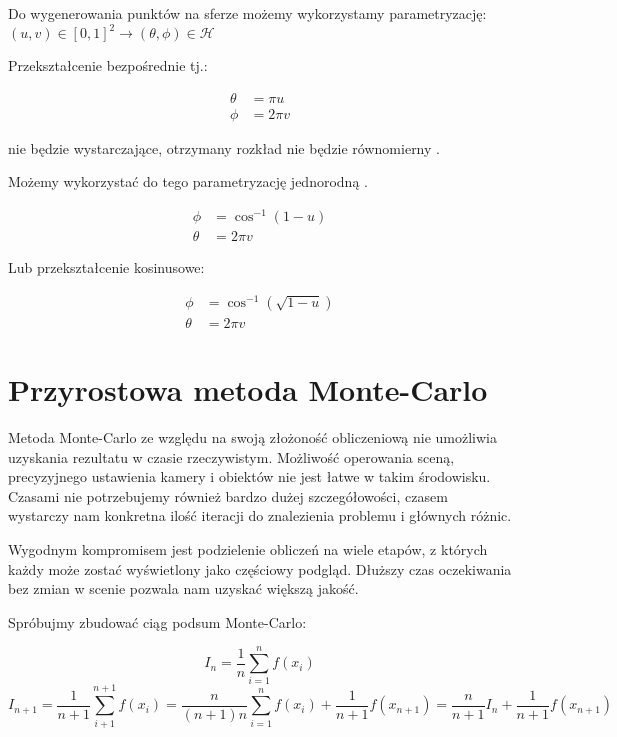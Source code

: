 \documentclass[../main.tex]{subfiles}
\begin{document}
Do wygenerowania punktów na sferze możemy wykorzystamy parametryzację:
  $(u,v) \in [0,1]^2 \rightarrow (\theta, \phi) \in \mathcal{H}$

Przekształcenie bezpośrednie tj.:

\begin{align*}
	\theta &= \pi u \\
  \phi &= 2 \pi v
\end{align*}

\noindent nie będzie wystarczające, otrzymany rozkład nie będzie równomierny
\cite{WolframSpherePointPicking}.

Możemy wykorzystać do tego parametryzację jednorodną \cite{dammertz_2012}
.

\begin{align*}
	\phi &= \cos^{-1}(1-u) \\
	\theta &= 2 \pi v
\end{align*}

Lub przekształcenie kosinusowe:

\begin{align*}
  \phi &= \cos^{-1}(\sqrt{1-u}) \\
  \theta &= 2 \pi v
\end{align*}


\section{Przyrostowa metoda Monte-Carlo}

Metoda Monte-Carlo ze względu na swoją złożoność obliczeniową nie umożliwia
uzyskania rezultatu w czasie rzeczywistym. Możliwość operowania sceną,
precyzyjnego ustawienia kamery i obiektów nie jest łatwe w takim środowisku.
Czasami nie potrzebujemy również bardzo dużej szczegółowości, czasem wystarczy
nam konkretna ilość iteracji do znalezienia problemu i głównych różnic.

Wygodnym kompromisem jest podzielenie obliczeń na wiele etapów, z których każdy
może zostać wyświetlony jako częściowy podgląd. Dłuższy czas oczekiwania bez
zmian w scenie pozwala nam uzyskać większą jakość.

Spróbujmy zbudować ciąg podsum Monte-Carlo:

\[ I_n = \frac{1}{n} \sum_{i=1}^{n} f(x_i) \]
\[
  I_{n+1} = \frac{1}{n+1} \sum_{i+1}^{n+1}f(x_i)
    = \frac{n}{(n+1)n} \sum_{i=1}^{n}f(x_i) + \frac{1}{n+1}f(x_{n+1})
    = \frac{n}{n+1} I_{n} + \frac{1}{n+1}f(x_{n+1})
\]
\end{document}
